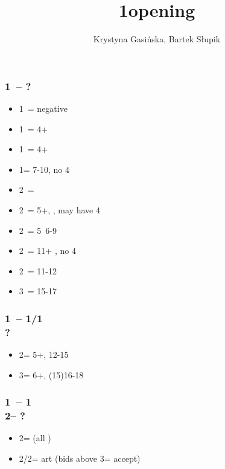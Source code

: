 \documentclass[12pt, a4paper]{article}
\title{1\clubs opening}
\author{Krystyna Gasińska, Bartek Słupik}
\begin{document}
\maketitle


\subsubsection*{1\clubs\ -- ?}
\begin{itemize}
    \item 1\diams\ = negative
    \item 1\hearts\ = 4+\hearts
    \item 1\spades\ = 4+\spades
    \item 1\nt = 7-10, no 4\major
    \item 2\clubs\ = \gf
    \item 2\diams\ = 5+\diams, \gf, may have 4\major
    \item 2\hearts\ = 5\hearts\ 6-9
    \item 2\spades\ = 11+ \bal, no 4\major
    \item 2\ntx\ = 11-12 \bal
    \item 3\nt\ = 15-17 \bal
\end{itemize}

\subsubsection*{1\clubs\ -- 1\hearts/1\spades \\ ?}
\begin{itemize}
    \item 2\clubs = 5+\clubs, 12-15 \unbal
    \item 3\clubs = 6+\clubs, (15)16-18 \unbal
\end{itemize}

\subsubsection*{1\clubs\ -- 1\hearts \\ 
                2\clubs -- ?}
\begin{itemize}
    \item 2\diams = \gf (\then all \nat)
    \item 2\spades/2\nt = \inv art (bids above 3\clubs = accept)
\end{itemize}
\end{document}

